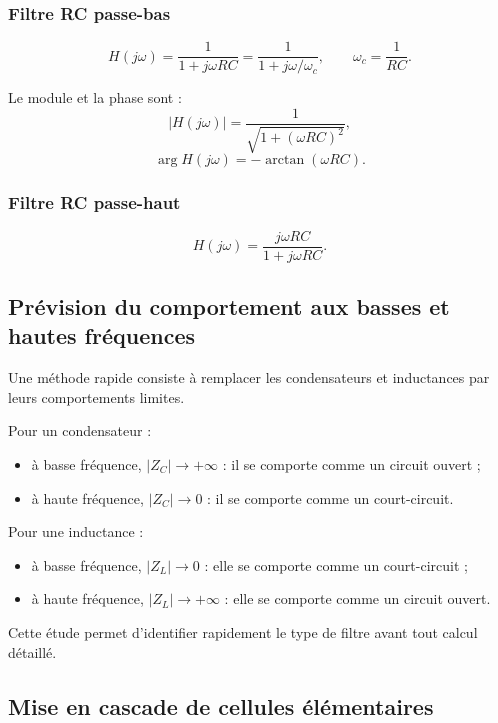 \subsubsection{Filtre RC passe-bas}

\TLFiltreRCPasseBas

\[
H(j\omega)=\frac{1}{1+j\omega RC}
=\frac{1}{1+j\omega/\omega_c},
\qquad
\omega_c=\frac{1}{RC}.
\]

Le module et la phase sont :
\[
|H(j\omega)|=\frac{1}{\sqrt{1+(\omega RC)^2}},
\]
\[
\arg H(j\omega)=-\arctan(\omega RC).
\]

\subsubsection{Filtre RC passe-haut}

\TLFiltreRCPasseHaut

\[
H(j\omega)=\frac{j\omega RC}{1+j\omega RC}.
\]

\subsection{Prévision du comportement aux basses et hautes fréquences}

Une méthode rapide consiste à remplacer les condensateurs et inductances par leurs comportements limites.

Pour un condensateur :
\begin{itemize}
  \item à basse fréquence, $|Z_C|\to +\infty$ : il se comporte comme un circuit ouvert ;
  \item à haute fréquence, $|Z_C|\to 0$ : il se comporte comme un court-circuit.
\end{itemize}

Pour une inductance :
\begin{itemize}
  \item à basse fréquence, $|Z_L|\to 0$ : elle se comporte comme un court-circuit ;
  \item à haute fréquence, $|Z_L|\to +\infty$ : elle se comporte comme un circuit ouvert.
\end{itemize}

Cette étude permet d'identifier rapidement le type de filtre avant tout calcul détaillé.

\subsection{Mise en cascade de cellules élémentaires}

